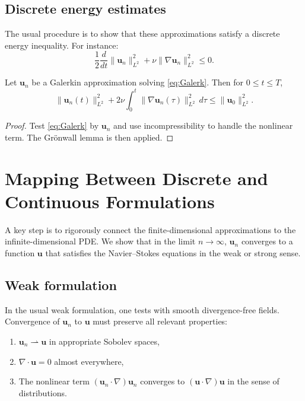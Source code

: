 \documentclass[11pt]{article}
\numberwithin{equation}{section}
\begin{document}
\subsection{Discrete energy estimates}

The usual procedure is to show that these approximations satisfy a discrete
energy inequality. For instance:
\[
\frac{1}{2} \frac{d}{dt} \|\mathbf{u}_n\|_{L^2}^2
+ \nu \|\nabla \mathbf{u}_n\|_{L^2}^2 \le 0.
\]

\begin{lemma}
Let \(\mathbf{u}_n\) be a Galerkin approximation solving \eqref{eq:Galerk}.
Then for \(0 \le t \le T\),
\[
\|\mathbf{u}_n(t)\|_{L^2}^2 + 2\nu
\int_0^t \|\nabla \mathbf{u}_n(\tau)\|_{L^2}^2 \, d\tau
\le \|\mathbf{u}_0\|_{L^2}^2.
\]
\end{lemma}

\begin{proof}
Test \eqref{eq:Galerk} by \(\mathbf{u}_n\) and use incompressibility to handle
the nonlinear term. The Grönwall lemma is then applied.
\end{proof}

\section{Mapping Between Discrete and Continuous Formulations}\label{sec:mapping}

A key step is to rigorously connect the finite-dimensional approximations to the
infinite-dimensional PDE. We show that in the limit \(n \to \infty\),
\(\mathbf{u}_n\) converges to a function \(\mathbf{u}\) that satisfies
the Navier--Stokes equations in the weak or strong sense.

\subsection{Weak formulation}

In the usual weak formulation, one tests with smooth divergence-free fields.
Convergence of \(\mathbf{u}_n\) to \(\mathbf{u}\) must preserve all relevant
properties:
\begin{enumerate}[label=(\roman*)]
\item \(\mathbf{u}_n \rightharpoonup \mathbf{u}\) in appropriate Sobolev spaces,
\item \(\nabla \cdot \mathbf{u} = 0\) almost everywhere,
\item The nonlinear term \((\mathbf{u}_n \cdot \nabla)\mathbf{u}_n\) converges
      to \((\mathbf{u}\cdot \nabla)\mathbf{u}\) in the sense of distributions.
\end{enumerate}
\end{document}
